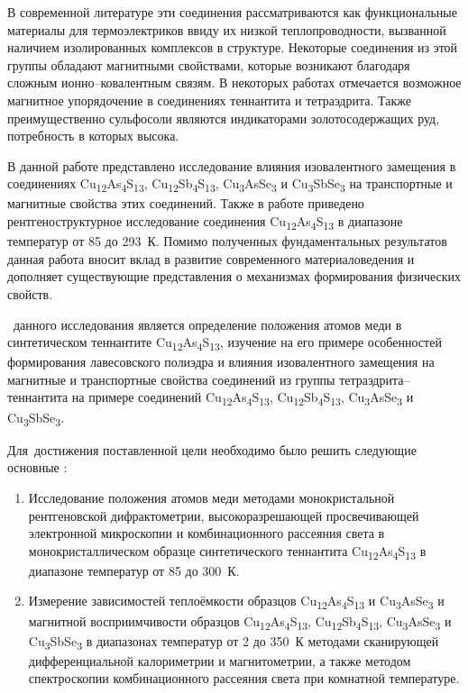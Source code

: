 В современной литературе эти соединения рассматриваются как функциональные материалы для термоэлектриков ввиду их низкой теплопроводности, вызванной наличием изолированных комплексов в структуре.
Некоторые соединения из этой группы обладают магнитными свойствами, которые возникают благодаря сложным ионно--ковалентным связям. В некоторых работах отмечается возможное магнитное упорядочение в соединениях теннантита и тетраэдрита.
Также преимущественно сульфосоли являются индикаторами золотосодержащих руд, потребность в которых высока.

В данной работе представлено исследование влияния изовалентного замещения в соединениях Cu\textsubscript{12}As\textsubscript{4}S\textsubscript{13}, Cu\textsubscript{12}Sb\textsubscript{4}S\textsubscript{13}, Cu\textsubscript{3}AsSe\textsubscript{3} и Cu\textsubscript{3}SbSe\textsubscript{3} на транспортные и магнитные свойства этих соединений.
Также в работе приведено рентгеноструктурное исследование соединения  Cu\textsubscript{12}As\textsubscript{4}S\textsubscript{13} в диапазоне температур от 85 до 293~К.  Помимо полученных фундаментальных результатов данная работа вносит вклад в развитие современного материаловедения и дополняет существующие представления о механизмах формирования физических свойств.

 \aim\ данного исследования является определение положения атомов меди в синтетическом теннантите
 Cu\textsubscript{12}As\textsubscript{4}S\textsubscript{13}, изучение на его примере особенностей формирования лавесовского полиэдра и влияния изовалентного замещения на магнитные и транспортные свойства соединений из группы тетраэдрита--теннантита на примере соединений  Cu\textsubscript{12}As\textsubscript{4}S\textsubscript{13}, Cu\textsubscript{12}Sb\textsubscript{4}S\textsubscript{13}, Cu\textsubscript{3}AsSe\textsubscript{3} и Cu\textsubscript{3}SbSe\textsubscript{3}.

Для~достижения поставленной цели необходимо было решить следующие основные {\tasks}:
\begin{enumerate}
  \item Исследование положения атомов меди методами монокристальной рентгеновской дифрактометрии, высокоразрешающей просвечивающей  электронной микроскопии и комбинационного рассеяния света в монокристаллическом образце синтетического теннантита Cu\textsubscript{12}As\textsubscript{4}S\textsubscript{13} в диапазоне температур от 85 до 300~К.
  \item Измерение зависимостей теплоёмкости образцов Cu\textsubscript{12}As\textsubscript{4}S\textsubscript{13} и Cu\textsubscript{3}AsSe\textsubscript{3} и магнитной восприимчивости  образцов Cu\textsubscript{12}As\textsubscript{4}S\textsubscript{13}, Cu\textsubscript{12}Sb\textsubscript{4}S\textsubscript{13}, Cu\textsubscript{3}AsSe\textsubscript{3} и Cu\textsubscript{3}SbSe\textsubscript{3} в диапазонах температур от 2  до 350~К методами сканирующей дифференциальной калориметрии и магнитометрии, а также методом спектроскопии комбинационного рассеяния света при комнатной температуре.

\end{enumerate}

